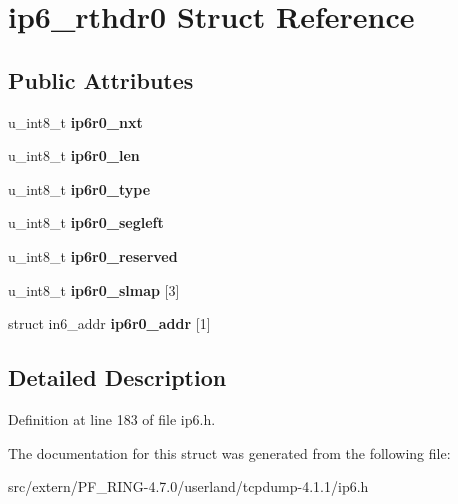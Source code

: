 \hypertarget{structip6__rthdr0}{
\section{ip6\_\-rthdr0 Struct Reference}
\label{structip6__rthdr0}
}
\subsection*{Public Attributes}
\begin{DoxyCompactItemize}
\item 
\hypertarget{structip6__rthdr0_ad036b5eea882565f0deafecd5fccc719}{
u\_\-int8\_\-t {\bfseries ip6r0\_\-nxt}}
\label{structip6__rthdr0_ad036b5eea882565f0deafecd5fccc719}

\item 
\hypertarget{structip6__rthdr0_a7336298e4596dc1d370652e928f0e798}{
u\_\-int8\_\-t {\bfseries ip6r0\_\-len}}
\label{structip6__rthdr0_a7336298e4596dc1d370652e928f0e798}

\item 
\hypertarget{structip6__rthdr0_aa1ce1065192674a6c78adec9bf46c36c}{
u\_\-int8\_\-t {\bfseries ip6r0\_\-type}}
\label{structip6__rthdr0_aa1ce1065192674a6c78adec9bf46c36c}

\item 
\hypertarget{structip6__rthdr0_a5c5ddfaf7ad0ab214e740366ba1f5e84}{
u\_\-int8\_\-t {\bfseries ip6r0\_\-segleft}}
\label{structip6__rthdr0_a5c5ddfaf7ad0ab214e740366ba1f5e84}

\item 
\hypertarget{structip6__rthdr0_a150425e1c00e7b440ff5eb1baab14241}{
u\_\-int8\_\-t {\bfseries ip6r0\_\-reserved}}
\label{structip6__rthdr0_a150425e1c00e7b440ff5eb1baab14241}

\item 
\hypertarget{structip6__rthdr0_ab5892a67d1dbad23c06d5c5a507f046f}{
u\_\-int8\_\-t {\bfseries ip6r0\_\-slmap} \mbox{[}3\mbox{]}}
\label{structip6__rthdr0_ab5892a67d1dbad23c06d5c5a507f046f}

\item 
\hypertarget{structip6__rthdr0_a7d8e211426295e369740c4428035c4ac}{
struct in6\_\-addr {\bfseries ip6r0\_\-addr} \mbox{[}1\mbox{]}}
\label{structip6__rthdr0_a7d8e211426295e369740c4428035c4ac}

\end{DoxyCompactItemize}


\subsection{Detailed Description}


Definition at line 183 of file ip6.h.



The documentation for this struct was generated from the following file:\begin{DoxyCompactItemize}
\item 
src/extern/PF\_\-RING-\/4.7.0/userland/tcpdump-\/4.1.1/ip6.h\end{DoxyCompactItemize}
